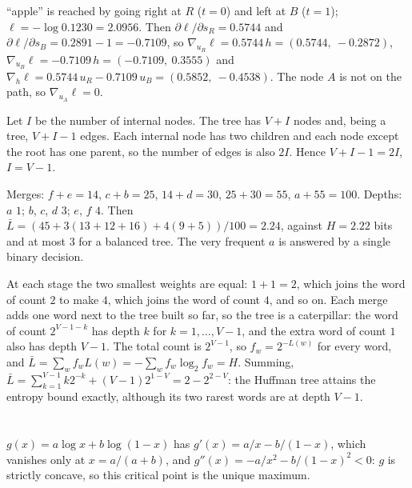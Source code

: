 \section{}

``apple'' is reached by going right at $R$ ($t = 0$) and left at $B$ ($t = 1$); $\ell = -\log0.1230 = 2.0956$. Then
$\partial\ell/\partial s_R = 0.5744$ and $\partial\ell/\partial s_B = 0.2891 - 1 = -0.7109$, so $\nabla_{u_R}\ell = 0.5744\,h = (0.5744,\ -0.2872)$,
$\nabla_{u_B}\ell = -0.7109\,h = (-0.7109,\ 0.3555)$ and $\nabla_h\ell = 0.5744\,u_R - 0.7109\,u_B = (0.5852,\ -0.4538)$. The node $A$ is not on the path, so
$\nabla_{u_A}\ell = 0$.

Let $I$ be the number of internal nodes. The tree has $V + I$ nodes and, being a tree, $V + I - 1$ edges. Each
internal node has two children and each node except the root has one parent, so the number of
edges is also $2I$. Hence $V + I - 1 = 2I$, $I = V - 1$.

Merges: $f + e = 14$, $c + b = 25$, $14 + d = 30$, $25 + 30 = 55$, $a + 55 = 100$. Depths: $a$ $1$; $b$, $c$, $d$ $3$; $e$, $f$ $4$. Then
$\bar L = (45 + 3(13 + 12 + 16) + 4(9 + 5))/100 = 2.24$, against $H = 2.22$ bits and at most $3$ for a balanced tree.
The very frequent $a$ is answered by a single binary decision.

At each stage the two smallest weights are equal: $1 + 1 = 2$, which joins the word of count $2$ to make $4$, which
joins the word of count $4$, and so on. Each merge adds one word next to the tree built so far,
so the tree is a caterpillar: the word of count $2^{V-1-k}$ has depth $k$ for $k = 1,\dots,V - 1$, and the extra word of
count $1$ also has depth $V - 1$. The total count is $2^{V-1}$, so $f_w = 2^{-L(w)}$ for every word, and
$\bar L = \sum_wf_wL(w) = -\sum_wf_w\log_2f_w = H$. Summing, $\bar L = \sum_{k=1}^{V-1}k2^{-k} + (V - 1)2^{1-V} = 2 - 2^{2-V}$: the Huffman tree attains the entropy
bound exactly, although its two rarest words are at depth $V - 1$.

\section{}

$g(x) = a\log x + b\log(1 - x)$ has $g'(x) = a/x - b/(1 - x)$, which vanishes only at $x = a/(a + b)$, and $g''(x) = -a/x^2 - b/(1 - x)^2 < 0$: $g$ is
strictly concave, so this critical point is the unique maximum.

